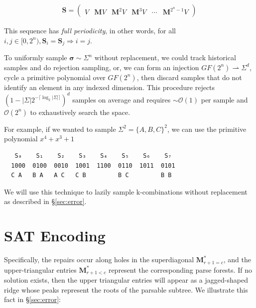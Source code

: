 \documentclass[sigplan,nonacm]{acmart}\settopmatter{printfolios=false,printccs=false,printacmref=false}
\begin{document}
\begin{align}
    \mathbf{S} = \begin{pmatrix}V & \mathbf{M}V & \mathbf{M}^{2}V & \mathbf{M}^{3}V & \cdots & \mathbf{M}^{2^n-1}V \end{pmatrix}
\end{align}

\noindent This sequence has \textit{full periodicity}, in other words, for all $i, j \in [0, 2^n), \mathbf{S}_i = \mathbf{S}_j \Rightarrow i = j$.


To uniformly sample $\bm\sigma \sim \Sigma^n$ without replacement, we could track historical samples and do rejection sampling, or, we can form an injection $GF(2^n)\rightharpoonup\Sigma^d$, cycle a primitive polynomial over $GF(2^n)$, then discard samples that do not identify an element in any indexed dimension. This procedure rejects $(1 - |\Sigma|2^{-\lceil\log_2|\Sigma|\rceil})^d$ samples on average and requires $\sim\mathcal{O}(1)$ per sample and $\mathcal{O}(2^n)$ to exhaustively search the space.

For example, if we wanted to sample $\Sigma^2 = \{A, B, C\}^2$, we can use the primitive polynomial $x^4 + x^3 +1$

\begin{verbatim}
   S₀    S₁    S₂    S₃    S₄    S₅    S₆    S₇
  1000  0100  0010  1001  1100  0110  1011  0101
  C A   B A   A C   C B         B C         B B
\end{verbatim}

We will use this technique to lazily sample k-combinations without replacement as described in \S\ref{sec:error}.

\pagebreak
\section{SAT Encoding}\label{sec:sat}

Specifically, the repairs occur along holes in the superdiagonal $\mathbf{M}^*_{r+1 = c}$, and the upper-triangular entries $\mathbf{M}^*_{r + 1 < c}$ represent the corresponding parse forests. If no solution exists, then the upper triangular entries will appear as a jagged-shaped ridge whose peaks represent the roots of the parsable subtree. We illustrate this fact in \S\ref{sec:error}:
\end{document}
